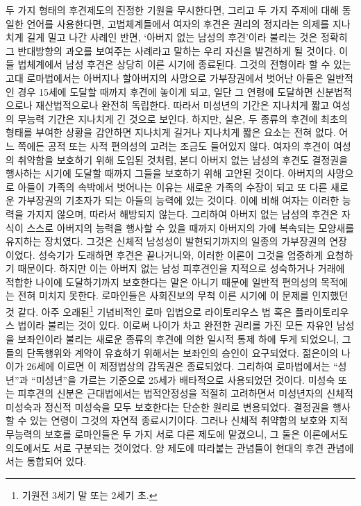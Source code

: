 두 가지 형태의 후견제도의 진정한 기원을 무시한다면,
그리고 두 가지 주제에 대해 동일한 언어를 사용한다면,
고법체계들에서
여자의 후견은
권리의 정지라는 의제를 지나치게 길게 밀고 나간 사례인 반면,
`아버지 없는 남성의 후견'이라 불리는 것은
정확히 그 반대방향의 과오를 보여주는 사례라고 말하는
우리 자신을 발견하게 될 것이다.
이들 법체계에서 남성 후견은 상당히 이른 시기에 종료된다.
그것의 전형이라 할 수 있는 고대 로마법에서는
아버지나 할아버지의 사망으로 가부장권에서 벗어난 아들은
일반적인 경우 15세에 도달할 때까지 후견에 놓이게 되고, 일단
그 연령에 도달하면 신분법적으로나 재산법적으로나 완전히 독립한다.
따라서 미성년의 기간은 지나치게 짧고
여성의 무능력 기간은 지나치게 긴 것으로 보인다.
하지만, 실은,
두 종류의 후견에 최초의 형태를 부여한 상황을 감안하면
지나치게 길거나 지나치게 짧은 요소는 전혀 없다.
어느 쪽에든 공적 또는 사적 편의성의 고려는 조금도 들어있지 않다.
여자의 후견이 여성의 취약함을 보호하기 위해 도입된 것처럼,
본디 아버지 없는 남성의 후견도
결정권을 행사하는 시기에 도달할 때까지 그들을 보호하기 위해 고안된 것이다.
아버지의 사망으로 아들이 가족의 속박에서 벗어나는 이유는
새로운 가족의 수장이 되고 또 다른 새로운 가부장권의 기초자가 되는
아들의 능력에 있는 것이다.
이에 비해 여자는 이러한 능력을 가지지 않으며, 따라서
 해방되지 않는다.
그리하여 아버지 없는 남성의 후견은
자식이 스스로 아버지의 능력을 행사할 수 있을 때까지
아버지의 가에 복속되는 모양새를 유지하는
장치였다.
그것은 신체적 남성성이 발현되기까지의 일종의 가부장권의 연장이었다.
성숙기가 도래하면 후견은 끝나거니와,
이러한 이론이 그것을 엄중하게 요청하기 때문이다.
하지만 이는 아버지 없는 남성 피후견인을
지적으로 성숙하거나 거래에 적합한 나이에
도달하기까지 보호한다는 말은 아니기 때문에
일반적 편의성의 목적에는 전혀 미치지 못한다.
로마인들은 사회진보의 무척 이른 시기에 이 문제를 인지했던 것 같다.
아주 오래된\footnote{기원전 3세기 말 또는 2세기 초.}
기념비적인 로마 입법으로 라이토리우스 법
혹은 플라이토리우스 법이라 불리는 것이 있다.
이로써 나이가 차고 완전한 권리를 가진 모든 자유인 남성을
보좌인이라 불리는
새로운 종류의 후견에 의한
일시적 통제 하에 두게 되었으니,
그들의 단독행위와 계약이 유효하기 위해서는 보좌인의 승인이 요구되었다.
젊은이의 나이가 26세에 이르면 이 제정법상의 감독권은 종료되었다.
그리하여 로마법에서는 ``성년''과 ``미성년''을 가르는 기준으로
25세가 배타적으로 사용되었던 것이다.
미성숙 또는 피후견의 신분은
근대법에서는
법적안정성을 적절히 고려하면서
미성년자의 신체적 미성숙과 정신적 미성숙을 모두 보호한다는
단순한 원리로 변용되었다.
결정권을 행사할 수 있는 연령이 그것의 자연적 종료시기이다.
그러나 신체적 취약함의 보호와 지적 무능력의 보호를
로마인들은 두 가지 서로 다른 제도에 맡겼으니, 그 둘은
이론에서도 의도에서도 서로 구분되는 것이었다.
양 제도에 따라붙는 관념들이 현대의 후견 관념에서는 통합되어 있다.

